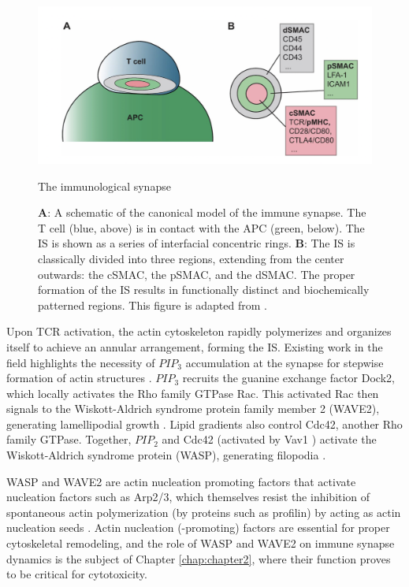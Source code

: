 \begin{figure}[htbp]
	\centering
	\includegraphics[width=\textwidth]{../figures/chapter1/immunesynapse.png}
	\caption{The immunological synapse}
	\caption*{\textbf{A}: A schematic of the canonical model of the immune synapse. The T cell (blue, above) is in contact with the APC (green, below). The IS is shown as a series of interfacial concentric rings.  \textbf{B}: The IS is classically divided into three regions, extending from the center outwards: the cSMAC, the pSMAC, and the dSMAC.  The proper formation of the IS results in functionally distinct and biochemically patterned regions.  This figure is adapted from \cite{Yu2013}.}
	\label{fig:immunesynapse}
\end{figure}

Upon TCR activation, the actin cytoskeleton rapidly polymerizes and organizes itself to achieve an annular arrangement, forming the IS. Existing work in the field highlights the necessity of $PIP_3$ accumulation at the synapse for stepwise formation of actin structures \cite{LeFloch2013}. $PIP_3$ recruits the guanine exchange factor Dock2, which locally activates the Rho family GTPase Rac. This activated Rac then signals to the Wiskott-Aldrich syndrome protein family member 2 (WAVE2), generating lamellipodial growth \cite{LeFloch2013, Derivery2010}. Lipid gradients also control Cdc42, another Rho family GTPase. Together, $PIP_2$ and Cdc42 (activated by Vav1 \cite{Abe2000}) activate the Wiskott-Aldrich syndrome protein (WASP), generating filopodia \cite{KennethE.PrehodaJessicaA.ScottR.DycheMullins2000}.

WASP and WAVE2 are actin nucleation promoting factors that activate nucleation factors such as Arp2/3, which themselves resist the inhibition of spontaneous actin polymerization (by proteins such as profilin) by acting as actin nucleation seeds \cite{Weston2012}. Actin nucleation (-promoting) factors are essential for proper cytoskeletal remodeling, and the role of WASP and WAVE2 on immune synapse dynamics is the subject of Chapter \ref{chap:chapter2}, where their function proves to be critical for cytotoxicity.


